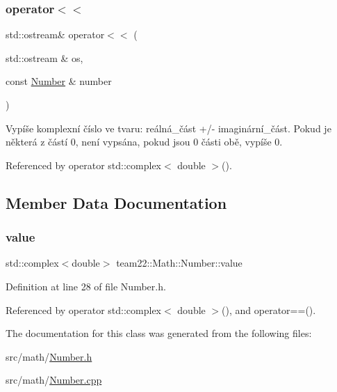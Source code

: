 \subsubsection{\texorpdfstring{operator$<$$<$}{operator<<}}
{\footnotesize\ttfamily std\+::ostream\& operator$<$$<$ (\begin{DoxyParamCaption}\item[{std\+::ostream \&}]{os,  }\item[{const \hyperlink{classteam22_1_1_math_1_1_number}{Number} \&}]{number }\end{DoxyParamCaption})\hspace{0.3cm}{\ttfamily [friend]}}

Vypíše komplexní číslo ve tvaru\+: reálná\+\_\+část +/-\/ imaginární\+\_\+část. Pokud je některá z částí 0, není vypsána, pokud jsou 0 části obě, vypíše 0. 

Referenced by operator std\+::complex$<$ double $>$().



\subsection{Member Data Documentation}
\mbox{\label{classteam22_1_1_math_1_1_number_a596bb514d860fbbcec3f114c3f73a59b}} 
\subsubsection{\texorpdfstring{value}{value}}
{\footnotesize\ttfamily std\+::complex$<$double$>$ team22\+::\+Math\+::\+Number\+::value\hspace{0.3cm}{\ttfamily [private]}}



Definition at line 28 of file Number.\+h.



Referenced by operator std\+::complex$<$ double $>$(), and operator==().



The documentation for this class was generated from the following files\+:\begin{DoxyCompactItemize}
\item 
src/math/\hyperlink{_number_8h}{Number.\+h}\item 
src/math/\hyperlink{_number_8cpp}{Number.\+cpp}\end{DoxyCompactItemize}
